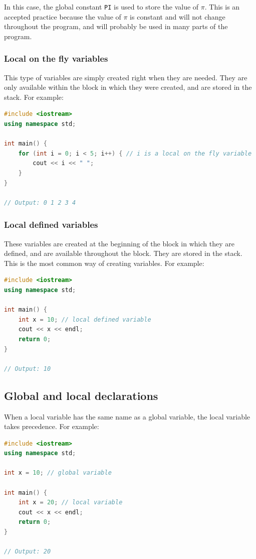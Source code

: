 In this case, the global constant \texttt{PI} is used to store the value of $\pi$. This is an accepted practice because
the value of $\pi$ is constant and will not change throughout the program, and will probably be used in many parts 
of the program.

\subsubsection{Local on the fly variables}

This type of variables are simply created right when they are needed. They are only available within the block in which
they were created, and are stored in the stack. For example:\\

\begin{lstlisting}[language=C++]
#include <iostream>
using namespace std;

int main() {
    for (int i = 0; i < 5; i++) { // i is a local on the fly variable
        cout << i << " ";
    }
}

// Output: 0 1 2 3 4
\end{lstlisting}

\subsubsection{Local defined variables}

These variables are created at the beginning of the block in which they are defined, and are available throughout the block.
They are stored in the stack. This is the most common way of creating variables. For example:\\

\begin{lstlisting}[language=C++]
#include <iostream>
using namespace std;

int main() {
    int x = 10; // local defined variable
    cout << x << endl;
    return 0;
}

// Output: 10
\end{lstlisting}

\subsection{Global and local declarations}

When a local variable has the same name as a global variable, the local variable takes precedence. For example:

\begin{lstlisting}[language=C++]
#include <iostream>
using namespace std;

int x = 10; // global variable

int main() {
    int x = 20; // local variable
    cout << x << endl;
    return 0;
}

// Output: 20
\end{lstlisting}

